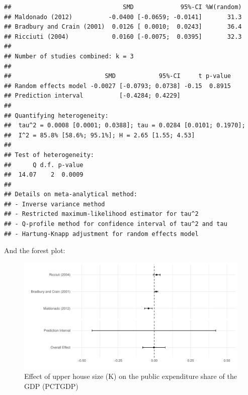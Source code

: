 \documentclass[
]{article}
\newenvironment{Shaded}{\begin{snugshade}}{\end{snugshade}}
\newcommand{\CommentTok}[1]{\textcolor[rgb]{0.56,0.35,0.01}{\textit{#1}}}
\newcommand{\DataTypeTok}[1]{\textcolor[rgb]{0.13,0.29,0.53}{#1}}
\newcommand{\KeywordTok}[1]{\textcolor[rgb]{0.13,0.29,0.53}{\textbf{#1}}}
\newcommand{\NormalTok}[1]{#1}
\newcommand{\OperatorTok}[1]{\textcolor[rgb]{0.81,0.36,0.00}{\textbf{#1}}}
\newcommand{\OtherTok}[1]{\textcolor[rgb]{0.56,0.35,0.01}{#1}}
\newcommand{\StringTok}[1]{\textcolor[rgb]{0.31,0.60,0.02}{#1}}
\begin{document}
\begin{Shaded}
\end{Shaded}

\begin{verbatim}
##                               SMD             95%-CI %W(random)
## Maldonado (2012)          -0.0400 [-0.0659; -0.0141]       31.3
## Bradbury and Crain (2001)  0.0126 [ 0.0010;  0.0243]       36.4
## Ricciuti (2004)            0.0160 [-0.0075;  0.0395]       32.3
## 
## Number of studies combined: k = 3
## 
##                          SMD            95%-CI     t p-value
## Random effects model -0.0027 [-0.0793; 0.0738] -0.15  0.8915
## Prediction interval          [-0.4284; 0.4229]              
## 
## Quantifying heterogeneity:
##  tau^2 = 0.0008 [0.0001; 0.0388]; tau = 0.0284 [0.0101; 0.1970];
##  I^2 = 85.8% [58.6%; 95.1%]; H = 2.65 [1.55; 4.53]
## 
## Test of heterogeneity:
##      Q d.f. p-value
##  14.07    2  0.0009
## 
## Details on meta-analytical method:
## - Inverse variance method
## - Restricted maximum-likelihood estimator for tau^2
## - Q-profile method for confidence interval of tau^2 and tau
## - Hartung-Knapp adjustment for random effects model
\end{verbatim}

And the forest plot:

\begin{figure}
\centering
\includegraphics{appendixV5_files/figure-latex/unnamed-chunk-29-1.pdf}
\caption{Effect of upper house size (K) on the public expenditure share
of the GDP (PCTGDP)}
\end{figure}
\end{document}
